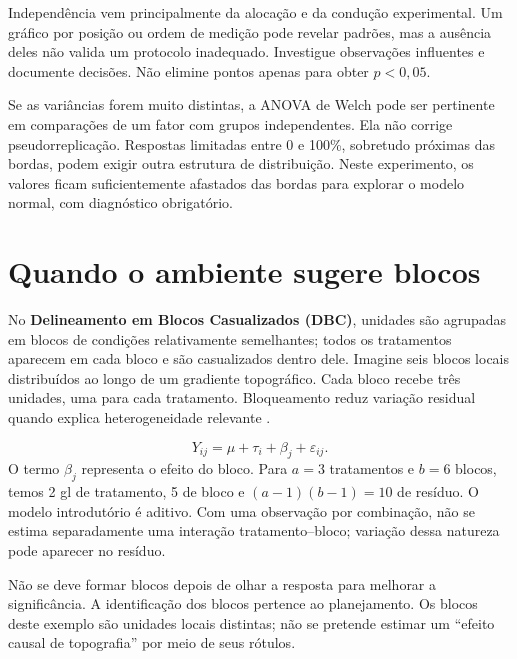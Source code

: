 
Independência vem principalmente da alocação e da condução experimental. Um gráfico por posição ou ordem de medição pode revelar padrões, mas a ausência deles não valida um protocolo inadequado. Investigue observações influentes e documente decisões. Não elimine pontos apenas para obter $p<0{,}05$.

Se as variâncias forem muito distintas, a ANOVA de Welch pode ser pertinente em comparações de um fator com grupos independentes. Ela não corrige pseudorreplicação. Respostas limitadas entre 0 e 100\%, sobretudo próximas das bordas, podem exigir outra estrutura de distribuição. Neste experimento, os valores ficam suficientemente afastados das bordas para explorar o modelo normal, com diagnóstico obrigatório.

\section{Quando o ambiente sugere blocos}
No \textbf{Delineamento em Blocos Casualizados (DBC)}, unidades são agrupadas em blocos de condições relativamente semelhantes; todos os tratamentos aparecem em cada bloco e são casualizados dentro dele. Imagine seis blocos locais distribuídos ao longo de um gradiente topográfico. Cada bloco recebe três unidades, uma para cada tratamento. Bloqueamento reduz variação residual quando explica heterogeneidade relevante \parencite{quinn2002}.

\begin{equation}Y_{ij}=\mu+\tau_i+\beta_j+\varepsilon_{ij}.\end{equation}
O termo $\beta_j$ representa o efeito do bloco. Para $a=3$ tratamentos e $b=6$ blocos, temos 2 gl de tratamento, 5 de bloco e $(a-1)(b-1)=10$ de resíduo. O modelo introdutório é aditivo. Com uma observação por combinação, não se estima separadamente uma interação tratamento--bloco; variação dessa natureza pode aparecer no resíduo.

Não se deve formar blocos depois de olhar a resposta para melhorar a significância. A identificação dos blocos pertence ao planejamento. Os blocos deste exemplo são unidades locais distintas; não se pretende estimar um ``efeito causal de topografia'' por meio de seus rótulos.

